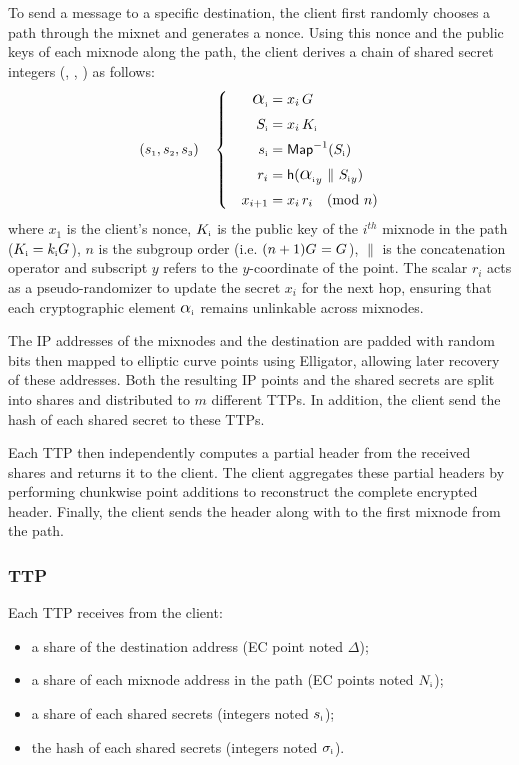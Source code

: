 To send a message to a specific destination, the client first randomly chooses a path through the mixnet and generates a nonce.
Using this nonce and the public keys of each mixnode along the path, the client derives a chain of shared secret integers (, , ) as follows:
\begin{equation}
(\s{1}, \s{2}, \s{3}) \quad \left\{ \quad
\begin{aligned}
    \A{i}    &= x_i \, G \\
    \S{i}    &= x_i \, \PK{i} \\
    \s{i}    &= \InverseMap{\S{i}} \\
    r_i      &= \hash{{\A{i}}_y \ \| \ {\S{i}}_y} \\
    x_{i+1}  &= x_i \, r_i \quad (\text{mod}\ n)
\end{aligned}
\right.
\label{eq:shared_secret}
\end{equation}
where $ x_1 $ is the client's nonce, $ \PK{i} $ is the public key of the $ i^{th} $ mixnode in the path ($\PK{i} = \sk{i}\G{}$), 
$ n $ is the subgroup order (i.e. $(n+1)\G{} = \G{}$), $ \| $ is  the concatenation operator and subscript $ y $ refers to the $ y $-coordinate of the point.
The scalar $ r_i $ acts as a pseudo-randomizer to update the secret $ x_i $ for the next hop, 
ensuring that each cryptographic element $ \A{i} $ remains unlinkable across mixnodes.

The IP addresses of the mixnodes and the destination are padded with random bits
then mapped to elliptic curve points using Elligator, allowing later recovery of these addresses.
Both the resulting IP points and the shared secrets are split into shares and distributed to $ m $ different TTPs. 
In addition, the client send the hash of each shared secret to these TTPs. %

Each TTP then independently computes a partial header from the received shares and returns it to the client. 
The client aggregates these partial headers by performing chunkwise point additions to reconstruct the complete encrypted header.
Finally, the client sends the header along with  to the first mixnode from the path. 

\subsubsection{TTP}
Each TTP receives from the client:
\begin{itemize}
    \item a share of the destination address (EC point noted $ \Delta $);
    \item a share of each mixnode address in the path (EC points noted $ \N{i} $);
    \item a share of each shared secrets (integers noted $ \s{i} $);
    \item the hash of each shared secrets (integers noted $ \sHashed{i} $).
\end{itemize}

